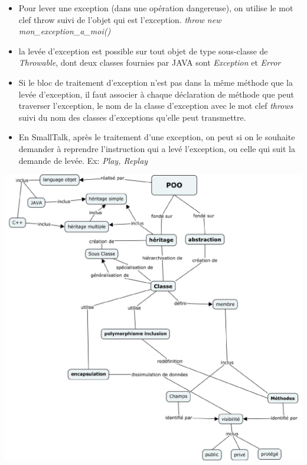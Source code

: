 \documentclass{article}
\begin{document}
\begin{itemize}
	\begin{itemize}
		\item Pour lever une exception (dans une opération dangereuse),
			on utilise le mot clef throw suivi de l'objet qui est l'exception.
			\emph{throw new mon\_exception\_a\_moi()}
		\item la levée d'exception est possible sur tout objet de type sous-classe de 
			\emph{Throwable}, dont deux classes fournies par JAVA sont 
			\emph{Exception} et \emph{Error}
		\item Si le bloc de traitement d'exception n'est pas dans la même
			méthode que la levée d'exception, il faut associer à chaque
			déclaration de méthode que peut traverser l'exception, le nom
			de la classe d'exception avec le mot clef \emph{throws} suivi du nom
			des classes d'exceptions qu'elle peut transmettre.
		\item En SmallTalk, après le traitement d'une exception, on peut si on
			le souhaite demander à reprendre l'instruction qui a levé
			l'exception, ou celle qui suit la demande de levée.
			Ex: \emph{Play, Replay}
	\end{itemize}
\end{itemize}

\includegraphics[scale=0.4]{resume2}
\end{document}
